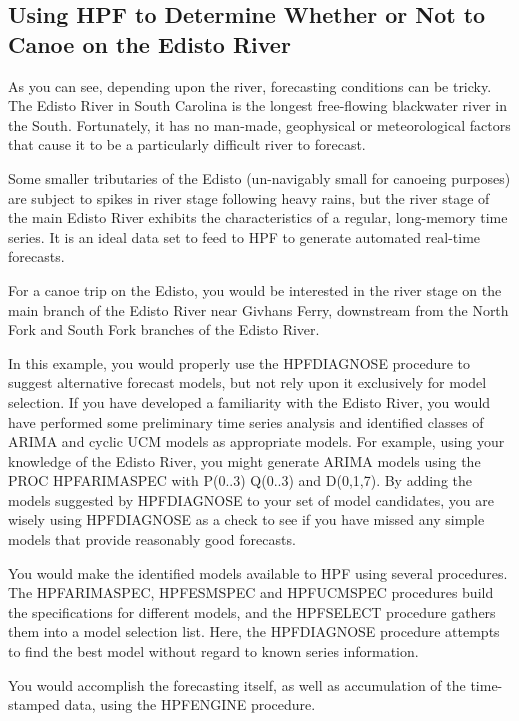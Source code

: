 \documentclass[10pt]{sugconf-ish}
\begin{document}
\newpage
\subsection{Using HPF to Determine Whether or Not to Canoe on the Edisto River}
As you can see, depending upon the river, forecasting conditions can be tricky. The Edisto River in South Carolina is the longest free-flowing blackwater river in the South. Fortunately, it has no man-made, geophysical or meteorological factors that cause it to be a particularly difficult river to forecast.

Some smaller tributaries of the Edisto (un-navigably small for canoeing purposes) are subject to spikes in river stage following heavy rains, but the river stage of the main Edisto River exhibits the characteristics of a regular, long-memory time series. It is an ideal data set to feed to HPF to generate automated real-time forecasts.

For a canoe trip on the Edisto, you would be interested in the river stage on the main branch of the Edisto River near Givhans Ferry, downstream from the North Fork and South Fork branches of the Edisto River.

In this example, you would properly use the HPFDIAGNOSE procedure to suggest alternative forecast models, but not rely upon it exclusively for model selection. If you have developed a familiarity with the Edisto River, you would have performed some preliminary time series analysis and identified classes of ARIMA and cyclic UCM models as appropriate models. For example, using your knowledge of the Edisto River, you might generate ARIMA models using the PROC HPFARIMASPEC with P(0..3) Q(0..3) and D(0,1,7). By adding the models suggested by HPFDIAGNOSE to your set of model candidates, you are wisely using HPFDIAGNOSE as a check to see if you have missed any simple models that provide reasonably good forecasts.

You would make the identified models available to HPF using several procedures. The HPFARIMASPEC, HPFESMSPEC and HPFUCMSPEC procedures build the specifications for different models, and the HPFSELECT procedure gathers them into a model selection list. Here, the HPFDIAGNOSE procedure attempts to find the best model without regard to known series information. 

You would accomplish the forecasting itself, as well as accumulation of the time-stamped data, using the HPFENGINE procedure.
\end{document}

